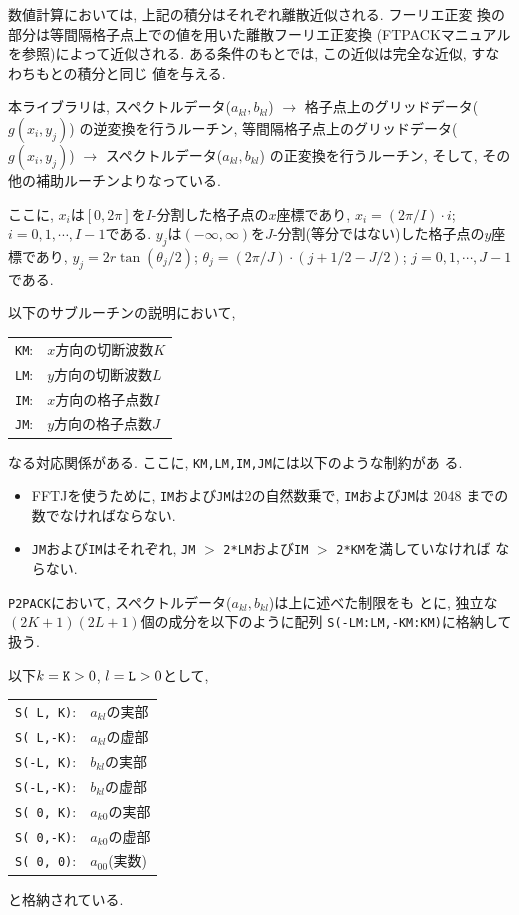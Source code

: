 \documentclass[a4j,fleqn]{jarticle}
\begin{document}
数値計算においては, 上記の積分はそれぞれ離散近似される. フーリエ正変
換の部分は等間隔格子点上での値を用いた離散フーリエ正変換
(FTPACKマニュアルを参照)によって近似される.
ある条件のもとでは, この近似は完全な近似, すなわちもとの積分と同じ
値を与える.

本ライブラリは, 
スペクトルデータ($a_{kl},b_{kl}$) 
$\to$ 格子点上のグリッドデータ($g(x_i,y_j)$) 
の逆変換を行うルーチン,
等間隔格子点上のグリッドデータ($g(x_i,y_j)$) 
$\to$ スペクトルデータ($a_{kl},b_{kl}$) 
の正変換を行うルーチン, 
そして, その他の補助ルーチンよりなっている.

ここに, $x_i$は$[0,2\pi]$を$I$-分割した格子点の$x$座標であり,
$x_i=(2\pi/I)\cdot i$;  $i=0,1,\cdots,I-1$である.
$y_j$は$(-\infty,\infty)$を$J$-分割(等分ではない)した格子点の$y$座標であり,
$y_j=2r\tan(\theta_j/2)$;
$\theta_j=(2\pi/J)\cdot(j+1/2-J/2)$;  $j=0,1,\cdots,J-1$である.

以下のサブルーチンの説明において,
\begin{center}
\begin{tabular}{rl}
{\tt KM}:& $x$方向の切断波数$K$\\
{\tt LM}:& $y$方向の切断波数$L$\\
{\tt IM}:& $x$方向の格子点数$I$\\
{\tt JM}:& $y$方向の格子点数$J$
\end{tabular}
\end{center}
なる対応関係がある. ここに, {\tt KM,LM,IM,JM}には以下のような制約があ
る.

\begin{itemize}
\item FFTJを使うために, {\tt IM}および{\tt JM}は2の自然数乗で,
{\tt IM}および{\tt JM}は 2048 までの数でなければならない.


\item {\tt JM}および{\tt IM}はそれぞれ, 
{\tt JM} $>$ {\tt 2*LM}および{\tt IM} $>$ {\tt 2*KM}を満していなければ
ならない.

\end{itemize}

{\tt P2PACK}において, スペクトルデータ($a_{kl},b_{kl}$)は上に述べた制限をも
とに, 独立な$(2K+1)(2L+1)$個の成分を以下のように配列
{\tt S(-LM:LM,-KM:KM)}に格納して扱う.

以下$k=\mbox{\tt K}>0$, $l=\mbox{\tt L}>0$として,
\begin{center}
\begin{tabular}{ll}
{\tt S( L, K)}:& $a_{kl}$の実部\\
{\tt S( L,-K)}:& $a_{kl}$の虚部\\
{\tt S(-L, K)}:& $b_{kl}$の実部\\
{\tt S(-L,-K)}:& $b_{kl}$の虚部\\
{\tt S( 0, K)}:& $a_{k0}$の実部\\
{\tt S( 0,-K)}:& $a_{k0}$の虚部\\
{\tt S( 0, 0)}:& $a_{00}$(実数)
\end{tabular}
\end{center}
と格納されている.
\end{document}
